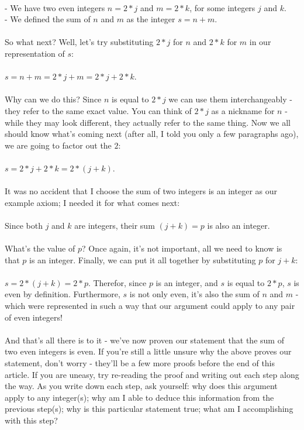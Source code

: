 \documentclass[a4paper,12pt]{article}
\begin{document}
\\
- We have two even integers $n = 2*j$ and $m = 2*k$, for some integers $j$ and $k$.\\
- We defined the sum of $n$ and $m$ as the integer $s = n + m$. \\
\\
So what next? Well, let's try substituting $2*j$ for $n$ and $2*k$ for $m$ in our representation of $s$: \\
\\
$s = n + m = 2*j + m = 2*j + 2*k$.\\
\\
Why can we do this? Since $n$ is equal to $2*j$ we can use them interchangeably - they refer to the same exact value. You can think of $2*j$ as a nickname for $n$ - while they may look different, they actually refer to the same thing. Now we all should know what's coming next (after all, I told you only a few paragraphs ago), we are going to factor out the $2$:\\
\\
$s = 2*j + 2*k = 2*(j + k)$. \\
\\
It was no accident that I choose the sum of two integers is an integer as our example axiom; I needed it for what comes next:\\
\\
Since both $j$ and $k$ are integers, their sum $(j + k) = p$ is also an integer.\\
\\
What's the value of $p$? Once again, it's not important, all we need to know is that $p$ is an integer. Finally, we can put it all together by substituting $p$ for $j + k$:\\
\\
$s = 2*(j + k) = 2*p$. Therefor, since $p$ is an integer, and $s$ is equal to $2*p$, $s$ is even by definition. Furthermore, $s$ is not only even, it's also the sum of $n$ and $m$ - which were represented in such a way that our argument could apply to any pair of even integers! \\
\\
And that's all there is to it - we've now proven our statement that the sum of two even integers is even. If you're still a little unsure why the above proves our statement, don't worry - they'll be a few more proofs before the end of this article. If you are uneasy, try re-reading the proof and writing out each step along the way. As you write down each step, ask yourself: why does this argument apply to any integer(s); why am I able to deduce this information from the previous step(s); why is this particular statement true; what am I accomplishing with this step? 
\end{document}
